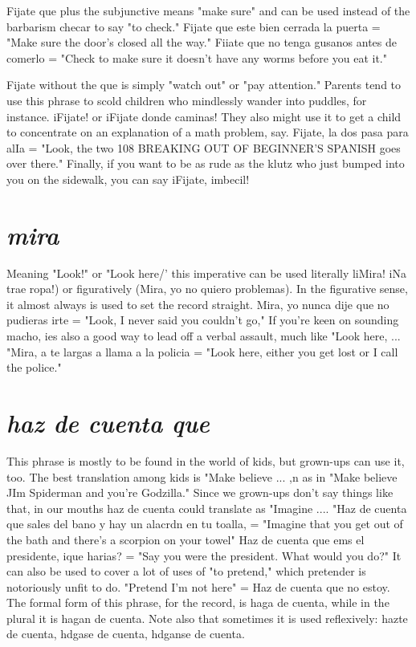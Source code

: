 \documentclass[14pt,a4paper,oneside]{memoir}
\begin{document}
Fijate que plus the subjunctive means "make sure" and can be
used instead of the barbarism checar to say "to check." Fijate que este
bien cerrada la puerta = "Make sure the door's closed all the way."
Fiiate que no tenga gusanos antes de comerlo = "Check to make sure
it doesn't have any worms before you eat it."

Fijate without the que is simply "watch out" or "pay attention." Parents tend to use this phrase to scold children who mindlessly
wander into puddles, for instance. iFijate! or iFijate donde caminas!
They also might use it to get a child to concentrate on an explanation
of a math problem, say. Fijate, la dos pasa para alIa = "Look, the two
108 BREAKING OUT OF BEGINNER'S SPANISH
goes over there." Finally, if you want to be as rude as the klutz who
just bumped into you on the sidewalk, you can say iFijate, imbecil!

\section{\emph{mira}}

Meaning "Look!" or "Look here/' this imperative can be used
literally liMira! iNa trae ropa!) or figuratively (Mira, yo no quiero
problemas). In the figurative sense, it almost always is used to set the
record straight. Mira, yo nunca dije que no pudieras irte = "Look,
I never said you couldn't go," If you're keen on sounding macho, ies
also a good way to lead off a verbal assault, much like "Look here, ...
"Mira, a te largas a llama a la policia = "Look here, either you get
lost or I call the police."

\section{\emph{haz de cuenta que}}

This phrase is mostly to be found in the world of kids, but
grown-ups can use it, too. The best translation among kids is "Make
believe ... ,n as in "Make believe JIm Spiderman and you're Godzilla."
Since we grown-ups don't say things like that, in our mouths haz de
cuenta could translate as "Imagine .... "Haz de cuenta que sales del
bano y hay un alacrdn en tu toalla, = "Imagine that you get out of the
bath and there's a scorpion on your towel" Haz de cuenta que ems el
presidente, ique harias? = "Say you were the president. What would
you do?" It can also be used to cover a lot of uses of "to pretend,"
which pretender is notoriously unfit to do. "Pretend I'm not here" =
Haz de cuenta que no estoy. The formal form of this phrase, for the
record, is haga de cuenta, while in the plural it is hagan de cuenta.
Note also that sometimes it is used reflexively: hazte de cuenta, hdgase de cuenta, hdganse de cuenta.
\end{document}
